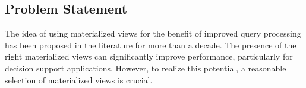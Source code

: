 







\subsection{Problem Statement}
The idea of using materialized views for the benefit of improved query processing has been proposed in the literature for more than a decade.\cite{Blakeley1986EfficientlyUM} The presence of the right materialized views can significantly improve performance, particularly for decision support applications. However, to realize this potential, a reasonable selection of materialized views is crucial.\cite{agrawal2000automated} \vspace{.4cm}

